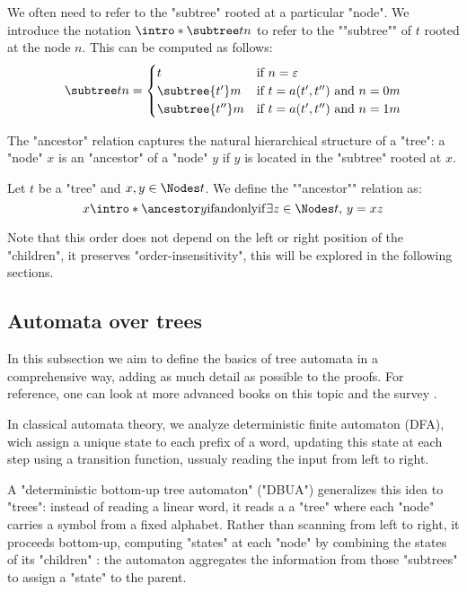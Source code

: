 \documentclass[a4paper,UKenglish,cleveref, autoref, thm-restate]{lipics-v2021}
\begin{document}
We often need to refer to the "subtree" rooted at a particular "node".
\AP We introduce the notation $\intro* \subtree t n$ to refer to the ""subtree""
of $t$ rooted at the node $n$. This can be computed as follows:
\[
	\subtree t n =   \begin{cases}
		t                & \text{if }  n = \varepsilon                  \\
		\subtree {t'} m  & \text{if } t = a(t',t'') \text{ and } n = 0m \\
		\subtree {t''} m & \text{if } t = a(t',t'') \text{ and } n = 1m
	\end{cases}
\]

The "ancestor" relation captures the natural hierarchical structure of a "tree": a "node" $x$ is an "ancestor"
of a "node" $y$ if $y$ is located in the "subtree" rooted at $x$.

\begin{definition}
	\AP Let $t$ be a "tree" and $x, y \in \Nodes t $. We define the ""ancestor"" relation as:
	\[
		x \intro* \ancestor y \tiff \exists z \in \Nodes t ,\, y = xz
	\]
\end{definition}

\begin{remark}
	Note that this order does not depend on the left or right position of the "children", \ie it preserves
	"order-insensitivity", this will be explored in the following sections.
\end{remark}


\subsection{Automata over trees}\label{sec:automata}

In this subsection we aim to define the basics of tree automata in a comprehensive way, adding as much detail as possible to the proofs. For reference,
one can look at more advanced books on this topic \cite{tata,bookautomata} and the survey \cite{Thomas1997}.

In classical automata theory, we analyze deterministic finite automaton (DFA), wich assign a unique state to each prefix of
a word, updating this state at each step using a transition function, ussualy reading the input from left to right.

A "deterministic bottom-up tree automaton" ("DBUA") generalizes this idea to "trees": instead of reading a linear word, it reads a
a "tree" where each "node" carries a symbol from a fixed alphabet. Rather than scanning from left to right, it proceeds
bottom-up, computing "states" at each "node" by combining the states of its "children" :
the automaton aggregates the information from those "subtrees" to assign a "state" to the parent.
\end{document}
